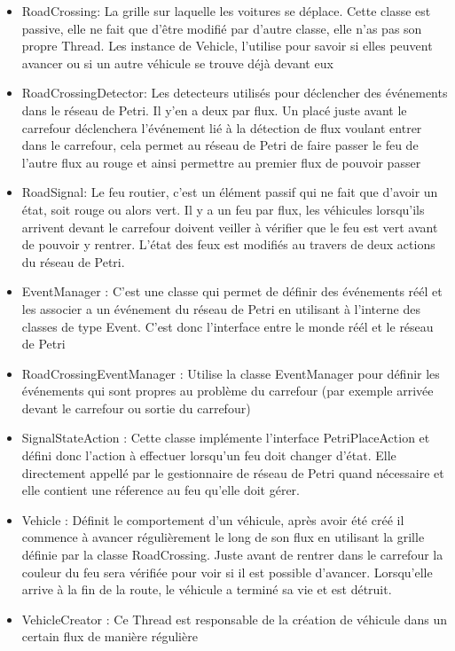 \documentclass[11pt,a4paper, openany]{memoir}
\begin{document}
\begin{itemize}
\item RoadCrossing: La grille sur laquelle les voitures se déplace. Cette classe est passive, elle ne fait que d'être modifié par d'autre classe, elle n'as pas son propre Thread. Les instance de Vehicle, l'utilise pour savoir si elles peuvent avancer ou si un autre véhicule se trouve déjà devant eux
\item RoadCrossingDetector: Les detecteurs utilisés pour déclencher des événements dans le réseau de Petri. Il y'en a deux par flux. Un placé juste avant le carrefour déclenchera l'événement lié à la détection de flux voulant entrer dans le carrefour, cela permet au réseau de Petri de faire passer le feu de l'autre flux au rouge et ainsi permettre au premier flux de pouvoir passer
\item RoadSignal: Le feu routier, c'est un élément passif qui ne fait que d'avoir un état, soit rouge ou alors vert. Il y a un feu par flux, les véhicules lorsqu'ils arrivent devant le carrefour doivent veiller à vérifier que le feu est vert avant de pouvoir y rentrer. L'état des feux est modifiés au travers de deux actions du réseau de Petri.
\item EventManager : C'est une classe qui permet de définir des événements réél et les associer a un événement du réseau de Petri en utilisant à l'interne des classes de type Event. C'est donc l'interface entre le monde réél et le réseau de Petri
\item RoadCrossingEventManager : Utilise la classe EventManager pour définir les événements qui sont propres au problème du carrefour (par exemple arrivée devant le carrefour ou sortie du carrefour)
\item SignalStateAction : Cette classe implémente l'interface PetriPlaceAction et défini donc l'action à effectuer lorsqu'un feu doit changer d'état. Elle directement appellé par le gestionnaire de réseau de Petri quand nécessaire et elle contient une réference au feu qu'elle doit gérer.
\item Vehicle : Définit le comportement d'un véhicule, après avoir été créé il commence à avancer régulièrement le long de son flux en utilisant la grille définie par la classe RoadCrossing. Juste avant de rentrer dans le carrefour la couleur du feu sera vérifiée pour voir si il est possible d'avancer. Lorsqu'elle arrive à la fin de la route, le véhicule a terminé sa vie et est détruit.
\item VehicleCreator : Ce Thread est responsable de la création de véhicule dans un certain flux de manière régulière

\end{itemize}
\end{document}
